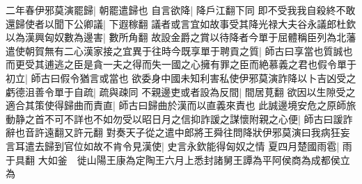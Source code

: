 二年春伊邪莫演罷歸|{
	朝罷遣歸也}
自言欲降|{
	降戶江翻下同}
即不受我我自殺終不敢還歸使者以聞下公卿議|{
	下遐稼翻}
議者或言宜如故事受其降光禄大夫谷永議郎杜欽以為漢興匈奴數為邊害|{
	數所角翻}
故設金爵之賞以待降者今單于屈體稱臣列為北藩遣使朝賀無有二心漢家接之宜異于往時今既享單于聘貢之質|{
	師古曰享當也質誠也}
而更受其逋逃之臣是貪一夫之得而失一國之心擁有罪之臣而絶慕義之君也假令單于初立|{
	師古曰假令猶言或當也}
欲委身中國未知利害私使伊邪莫演詐降以卜吉凶受之虧德沮善令單于自疏|{
	疏與疎同}
不親邊吏或者設為反間|{
	間居莧翻}
欲因以生隙受之適合其策使得歸曲而責直|{
	師古曰歸曲於漢而以直義來責也}
此誠邊境安危之原師旅動静之首不可不詳也不如勿受以昭日月之信抑詐諼之謀懷附親之心便|{
	師古曰諼詐辭也音許遠翻又許元翻}
對奏天子從之遣中郎將王舜往問降狀伊邪莫演曰我病狂妄言耳遣去歸到官位如故不肯令見漢使|{
	史言永欽能得匈奴之情}
夏四月楚國雨雹|{
	雨于具翻}
大如釜　徙山陽王康為定陶王六月上悉封諸舅王譚為平阿侯商為成都侯立為

